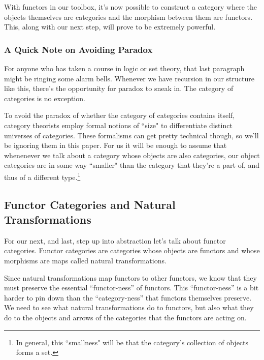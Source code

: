 \documentclass[12pt]{article}
\begin{document}
With functors in our toolbox, it's now possible to construct a category where the objects themselves are categories and the morphism between them are functors.
This, along with our next step, will prove to be extremely powerful.

\subsubsection*{A Quick Note on Avoiding Paradox}
For anyone who has taken a course in logic or set theory, that last paragraph might be ringing some alarm bells.
Whenever we have recursion in our structure like this, there's the opportunity for paradox to sneak in.
The category of categories is no exception.

To avoid the paradox of whether the category of categories contains itself, category theorists employ formal notions of ``size" to differentiate distinct universes of categories.
These formalisms can get pretty technical though, so we'll be ignoring them in this paper.
For us it will be enough to assume that whenenever we talk about a category whose objects are also categories, our object categories are in some way ``smaller" than the category that they're a part of, and thus of a different type.\footnote{In general, this ``smallness" will be that the category's collection of objects forms a set.}

\subsection*{Functor Categories and Natural Transformations}
For our next, and last, step up into abstraction let's talk about functor categories.
Functor categories are categories whose objects are functors and whose morphisms are maps called natural transformations.

Since natural transformations map functors to other functors, we know that they must preserve the essential ``functor-ness'' of functors.
This ``functor-ness'' is a bit harder to pin down than the ``category-ness'' that functors themselves preserve.
We need to see what natural transformations do to functors, but also what they do to the objects and arrows of the categories that the functors are acting on.
\end{document}
